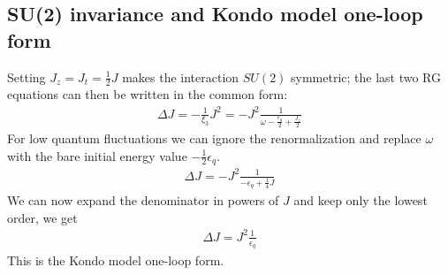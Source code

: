 \documentclass[twoside,11pt]{report}
\numberwithin{equation}{section}
\begin{document}
\subsection{SU(2) invariance and Kondo model one-loop form}
Setting \(J_z = J_t = \frac{1}{2} J\) makes the interaction \(SU(2)\) symmetric; the last two RG equations can then be written in the common form:
\begin{equation}\begin{aligned}
\Delta J = -\frac{1}{\xi_3}J^2 = -J^2\frac{1}{\omega - \frac{\epsilon_q}{2} + \frac{J_z}{2}}
\end{aligned}\end{equation}
For low quantum fluctuations we can ignore the renormalization and replace \(\omega\) with the bare initial energy value \(-\frac{1}{2}\epsilon_q\).
\begin{equation}\begin{aligned}
\Delta J = - J^2 \frac{1}{-\epsilon_q + \frac{1}{4}J}
\end{aligned}\end{equation}
We can now expand the denominator in powers of \(J\) and keep only the lowest order, we get
\begin{equation}\begin{aligned}
\Delta J = J^2 \frac{1}{\epsilon_q}
\end{aligned}\end{equation}
This is the Kondo model one-loop form.
\end{document}
